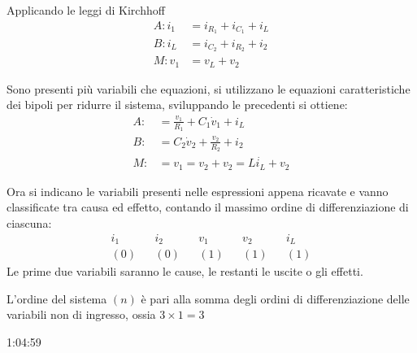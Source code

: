 Applicando le leggi di Kirchhoff
$$\begin{aligned}
A: i_1 &= i_{R_1} + i_{C_1} + i_L\\
B: i_L &= i_{C_2} + i_{R_2} + i_2 \\
M: v_1 &= v_L + v_2
\end{aligned}
$$

Sono presenti più variabili che equazioni, si utilizzano le equazioni caratteristiche dei bipoli per ridurre il sistema, sviluppando le precedenti si ottiene:
$$
\begin{aligned}
 A: &= \frac{v_1}{R_1} + C_1\dot{v}_1 + i_L \\
 B: &= C_2\dot{v}_2 + \frac{v_2}{R_2} + i_2 \\
 M: &= v_1 = v_2 + v_2 = L\dot{i_L} + v_2
\end{aligned}
$$

Ora si indicano le variabili presenti nelle espressioni appena ricavate e vanno classificate tra causa ed effetto, contando il massimo ordine di differenziazione di ciascuna:
$$\begin{aligned}
 i_1& &i_2& & v_1& &v_2& &i_L \\
 (0)& &(0)& & (1)& &(1)  & &(1)
\end{aligned}$$
Le prime due variabili saranno le cause, le restanti le uscite o gli effetti.

L'ordine del sistema $(n)$ è pari alla somma degli ordini di differenziazione delle variabili non di ingresso, ossia $3\times 1 = 3$

1:04:59
